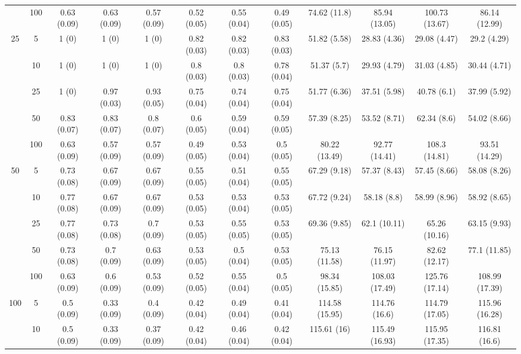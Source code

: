 \documentclass[11pt]{article}
\theoremstyle{definition}
\begin{document}
\begin{table}[H]
\begin{center}
{\begin{tabular}{cc|ccc|ccc|cccc|}
    & 100  & 0.63 (0.09) & 0.63 (0.09) & 0.57 (0.09) & 0.52 (0.05) & 0.55 (0.04) & 0.49 (0.05) & 74.62 (11.8) & 85.94 (13.05) & 100.73 (13.67) & 86.14 (12.99) \\[.3cm]
   \multirow{5}{*}{25}  & 5  & 1 (0) & 1 (0) & 1 (0) & 0.82 (0.03) & 0.82 (0.03) & 0.83 (0.03) & 51.82 (5.58) & 28.83 (4.36) & 29.08 (4.47) & 29.2 (4.29) \\ 
    & 10  & 1 (0) & 1 (0) & 1 (0) & 0.8 (0.03) & 0.8 (0.03) & 0.78 (0.04) & 51.37 (5.7) & 29.93 (4.79) & 31.03 (4.85) & 30.44 (4.71) \\ 
    & 25  & 1 (0) & 0.97 (0.03) & 0.93 (0.05) & 0.75 (0.04) & 0.74 (0.04) & 0.75 (0.04) & 51.77 (6.36) & 37.51 (5.98) & 40.78 (6.1) & 37.99 (5.92) \\ 
    & 50  & 0.83 (0.07) & 0.83 (0.07) & 0.8 (0.07) & 0.6 (0.05) & 0.59 (0.04) & 0.59 (0.05) & 57.39 (8.25) & 53.52 (8.71) & 62.34 (8.6) & 54.02 (8.66) \\ 
    & 100  & 0.63 (0.09) & 0.57 (0.09) & 0.57 (0.09) & 0.49 (0.05) & 0.53 (0.04) & 0.5 (0.05) & 80.22 (13.49) & 92.77 (14.41) & 108.3 (14.81) & 93.51 (14.29) \\[.3cm]
   \multirow{5}{*}{50}  & 5  & 0.73 (0.08) & 0.67 (0.09) & 0.67 (0.09) & 0.55 (0.05) & 0.51 (0.04) & 0.55 (0.05) & 67.29 (9.18) & 57.37 (8.43) & 57.45 (8.66) & 58.08 (8.26) \\ 
    & 10  & 0.77 (0.08) & 0.67 (0.09) & 0.67 (0.09) & 0.53 (0.05) & 0.53 (0.04) & 0.53 (0.05) & 67.72 (9.24) & 58.18 (8.8) & 58.99 (8.96) & 58.92 (8.65) \\ 
   & 25  & 0.77 (0.08) & 0.73 (0.08) & 0.7 (0.09) & 0.53 (0.05) & 0.55 (0.05) & 0.53 (0.05) & 69.36 (9.85) & 62.1 (10.11) & 65.26 (10.16) & 63.15 (9.93) \\ 
    & 50  & 0.73 (0.08) & 0.7 (0.09) & 0.63 (0.09) & 0.53 (0.05) & 0.5 (0.04) & 0.53 (0.05) & 75.13 (11.58) & 76.15 (11.97) & 82.62 (12.17) & 77.1 (11.85) \\ 
    & 100  & 0.63 (0.09) & 0.6 (0.09) & 0.53 (0.09) & 0.52 (0.05) & 0.55 (0.04) & 0.5 (0.05) & 98.34 (15.85) & 108.03 (17.49) & 125.76 (17.14) & 108.99 (17.39) \\[.3cm] 
 \multirow{5}{*}{100}  & 5  & 0.5 (0.09) & 0.33 (0.09) & 0.4 (0.09) & 0.42 (0.04) & 0.49 (0.04) & 0.41 (0.04) & 114.58 (15.95) & 114.76 (16.6) & 114.79 (17.05) & 115.96 (16.28) \\ 
  & 10  & 0.5 (0.09) & 0.33 (0.09) & 0.37 (0.09) & 0.42 (0.04) & 0.46 (0.04) & 0.42 (0.04) & 115.61 (16) & 115.49 (16.93) & 115.95 (17.35) & 116.81 (16.6) \\ 

\end{tabular}}
\end{center}
\end{table}
\end{document}

